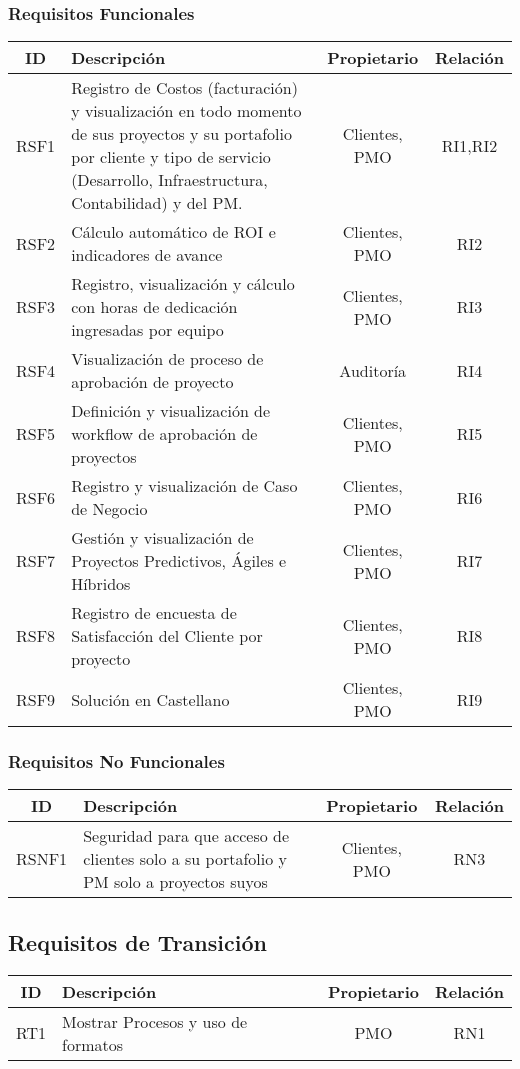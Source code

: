 \subsubsection*{Requisitos Funcionales}
\begin{tabular}{|c|p{7.5cm}|c|c|}
\hline
\textbf{ID} & \textbf{Descripción} & \textbf{Propietario} & \textbf{Relación} \\
\hline
RSF1 & Registro de Costos (facturación) y visualización en todo momento de sus proyectos y su portafolio por cliente y tipo de servicio (Desarrollo, Infraestructura, Contabilidad) y del PM. & Clientes, PMO & RI1,RI2 \\
\hline
RSF2 & Cálculo automático de ROI e indicadores de avance & Clientes, PMO & RI2 \\
\hline
RSF3 & Registro, visualización y cálculo con horas de dedicación ingresadas por equipo & Clientes, PMO & RI3 \\
\hline
RSF4 & Visualización de proceso de aprobación de proyecto & Auditoría & RI4 \\
\hline
RSF5 & Definición y visualización de workflow de aprobación de proyectos & Clientes, PMO & RI5 \\
\hline
RSF6 & Registro y visualización de Caso de Negocio & Clientes, PMO & RI6 \\
\hline
RSF7 & Gestión y visualización de Proyectos Predictivos, Ágiles e Híbridos & Clientes, PMO & RI7 \\
\hline
RSF8 & Registro de encuesta de Satisfacción del Cliente por proyecto & Clientes, PMO & RI8 \\
\hline
RSF9 & Solución en Castellano & Clientes, PMO & RI9 \\
\hline
\end{tabular}

\subsubsection*{Requisitos No Funcionales}
\begin{tabular}{|c|p{9cm}|c|c|}
\hline
\textbf{ID} & \textbf{Descripción} & \textbf{Propietario} & \textbf{Relación} \\
\hline
RSNF1 & Seguridad para que acceso de clientes solo a su portafolio y PM solo a proyectos suyos & Clientes, PMO & RN3 \\
\hline
\end{tabular}

\subsection*{Requisitos de Transición}
\begin{tabular}{|c|p{9cm}|c|c|}
\hline
\textbf{ID} & \textbf{Descripción} & \textbf{Propietario} & \textbf{Relación} \\
\hline
RT1 & Mostrar Procesos y uso de formatos & PMO & RN1 \\
\hline
\end{tabular}
